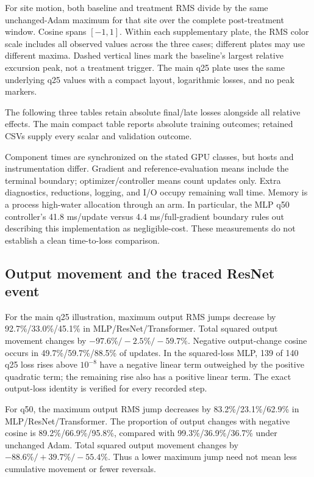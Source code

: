 For site motion, both baseline and treatment RMS divide by the same unchanged-Adam maximum for that site over the complete post-treatment window. Cosine spans $[-1,1]$. Within each supplementary plate, the RMS color scale includes all observed values across the three cases; different plates may use different maxima. Dashed vertical lines mark the baseline's largest relative excursion peak, not a treatment trigger. The main q25 plate uses the same underlying q25 values with a compact layout, logarithmic losses, and no peak markers.

The following three tables retain absolute final/late losses alongside all relative effects. The main compact table reports absolute training outcomes; retained CSVs supply every scalar and validation outcome.

\clearpage


Component times are synchronized on the stated GPU classes, but hosts and instrumentation differ. Gradient and reference-evaluation means include the terminal boundary; optimizer/controller means count updates only. Extra diagnostics, reductions, logging, and I/O occupy remaining wall time. Memory is a process high-water allocation through an arm. In particular, the MLP q50 controller's 41.8 ms/update versus 4.4 ms/full-gradient boundary rules out describing this implementation as negligible-cost. These measurements do not establish a clean time-to-loss comparison.

\clearpage


\clearpage
\subsection{Output movement and the traced ResNet event}
For the main q25 illustration, maximum output RMS jumps decrease by
92.7\%/33.0\%/45.1\% in MLP/ResNet/Transformer. Total squared output movement
changes by $-97.6\%/-2.5\%/-59.7\%$. Negative output-change cosine occurs in
49.7\%/59.7\%/88.5\% of updates. In the squared-loss MLP, 139 of 140 q25
loss rises above $10^{-8}$ have a negative linear term outweighed by the
positive quadratic term; the remaining rise also has a positive linear
term. The exact output-loss identity is verified for every recorded step.

For q50, the maximum output RMS jump decreases by 83.2\%/23.1\%/62.9\% in MLP/ResNet/Transformer. The proportion of output changes with negative cosine is 89.2\%/66.9\%/95.8\%, compared with 99.3\%/36.9\%/36.7\% under unchanged Adam. Total squared output movement changes by $-88.6\%/+39.7\%/-55.4\%$. Thus a lower maximum jump need not mean less cumulative movement or fewer reversals.

